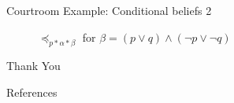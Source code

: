 \documentclass[11pt]{beamer}
\begin{document}
\begin{frame}[fragile]{Courtroom Example: Conditional beliefs 2}
\begin{figure}[H]
            \caption{$\preceq_{p \ast \alpha \ast \beta}$ for $\beta = (p \vee q) \wedge (\neg p \vee \neg q)$}
            \label{fig:example-preceq-revised-alien2}
    \end{figure}
    
\end{frame}

\begin{frame}{}
  \centering \Huge
  Thank You
\end{frame}

\begin{frame}{References}
    \typeout{}
    
    
\end{frame}
\end{document}
